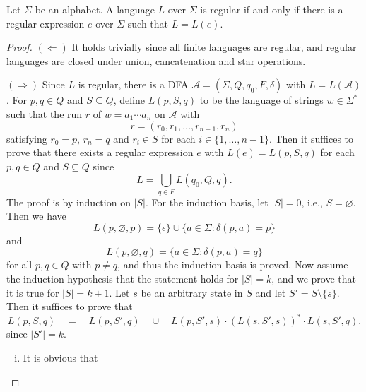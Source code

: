 \begin{theorem}
  Let $\Sigma$ be an alphabet.
  A language $L$ over $\Sigma$ is regular if and only if there is a regular
  expression $e$ over $\Sigma$ such that $L = L(e)$.
\end{theorem}
\begin{proof}
  $(\Leftarrow)$
  It holds trivially since all finite languages are regular, and regular
  languages are closed under union, cancatenation and star operations.

  $(\Rightarrow)$
  Since $L$ is regular, there is a DFA
  $\mathcal{A} = (\Sigma, Q, q_0, F, \delta)$ with $L = L(\mathcal{A})$.
  For $p, q \in Q$ and $S \subseteq Q$, define $L(p, S, q)$ to be the language
  of strings $w \in \Sigma^*$ such that the run $r$ of $w = a_1 \cdots a_n$
  on $\mathcal{A}$ with
  \begin{equation*}
    r = (r_0, r_1, \dots, r_{n-1}, r_n)
  \end{equation*}
  satisfying $r_0 = p$, $r_n = q$ and $r_i \in S$ for each
  $i \in \{1, \dots, n-1\}$.
  Then it suffices to prove that there exists a regular expression $e$ with
  $L(e) = L(p, S, q)$ for each $p, q \in Q$ and $S \subseteq Q$ since
  \begin{equation*}
    L = \bigcup_{q \in F} L(q_0, Q, q).
  \end{equation*}
  The proof is by induction on $|S|$.
  For the induction basis, let $|S| = 0$, i.e., $S = \varnothing$.
  Then we have
  \begin{equation*}
    L(p, \varnothing, p)
    = \{\epsilon\} \cup \{a \in \Sigma: \delta(p, a) = p\}
  \end{equation*}
  and
  \begin{equation*}
    L(p, \varnothing, q)
    = \{a \in \Sigma: \delta(p, a) = q\}
  \end{equation*}
  for all $p, q \in Q$ with $p \neq q$, and thus the induction basis is proved.
  Now assume the induction hypothesis that the statement holds for $|S| = k$,
  and we prove that it is true for $|S| = k + 1$.
  Let $s$ be an arbitrary state in $S$ and let $S' = S \setminus \{s\}$.
  Then it suffices to prove that
  \begin{equation*}
    L(p, S, q)
      \quad = \quad L(p, S', q)
      \quad \cup \quad
      L(p, S', s) \cdot (L(s, S', s))^* \cdot L(s, S', q).
  \end{equation*}
  since $|S'| = k$.
  \begin{enumerate}[(i)]
    \item It is obvious that 

\end{enumerate}
\end{proof}
